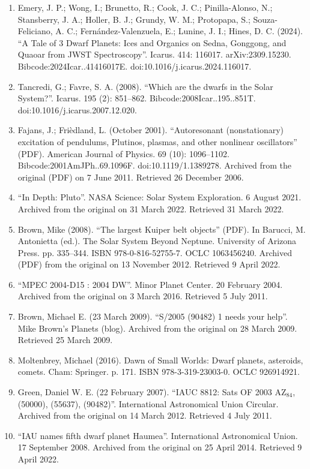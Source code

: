 \begin{enumerate}
\item Emery, J. P.; Wong, I.; Brunetto, R.; Cook, J. C.; Pinilla-Alonso, N.; Stansberry, J. A.; Holler, B. J.; Grundy, W. M.; Protopapa, S.; Souza-Feliciano, A. C.; Fernández-Valenzuela, E.; Lunine, J. I.; Hines, D. C. (2024). ``A Tale of 3 Dwarf Planets: Ices and Organics on Sedna, Gonggong, and Quaoar from JWST Spectroscopy''. Icarus. 414: 116017. arXiv:2309.15230. Bibcode:2024Icar..41416017E. doi:10.1016/j.icarus.2024.116017.
\item Tancredi, G.; Favre, S. A. (2008). ``Which are the dwarfs in the Solar System?''. Icarus. 195 (2): 851–862. Bibcode:2008Icar..195..851T. doi:10.1016/j.icarus.2007.12.020.
\item Fajans, J.; Frièdland, L. (October 2001). ``Autoresonant (nonstationary) excitation of pendulums, Plutinos, plasmas, and other nonlinear oscillators'' (PDF). American Journal of Physics. 69 (10): 1096–1102. Bibcode:2001AmJPh..69.1096F. doi:10.1119/1.1389278. Archived from the original (PDF) on 7 June 2011. Retrieved 26 December 2006.
\item ``In Depth: Pluto''. NASA Science: Solar System Exploration. 6 August 2021. Archived from the original on 31 March 2022. Retrieved 31 March 2022.
\item Brown, Mike (2008). ``The largest Kuiper belt objects'' (PDF). In Barucci, M. Antonietta (ed.). The Solar System Beyond Neptune. University of Arizona Press. pp. 335–344. ISBN 978-0-816-52755-7. OCLC 1063456240. Archived (PDF) from the original on 13 November 2012. Retrieved 9 April 2022.
\item ``MPEC 2004-D15 : 2004 DW''. Minor Planet Center. 20 February 2004. Archived from the original on 3 March 2016. Retrieved 5 July 2011.
\item Brown, Michael E. (23 March 2009). ``S/2005 (90482) 1 needs your help''. Mike Brown's Planets (blog). Archived from the original on 28 March 2009. Retrieved 25 March 2009.
\item Moltenbrey, Michael (2016). Dawn of Small Worlds: Dwarf planets, asteroids, comets. Cham: Springer. p. 171. ISBN 978-3-319-23003-0. OCLC 926914921.
\item Green, Daniel W. E. (22 February 2007). ``IAUC 8812: Sats OF 2003 AZ$_{84}$, (50000), (55637), (90482)''. International Astronomical Union Circular. Archived from the original on 14 March 2012. Retrieved 4 July 2011.
\item ``IAU names fifth dwarf planet Haumea''. International Astronomical Union. 17 September 2008. Archived from the original on 25 April 2014. Retrieved 9 April 2022.

\end{enumerate}
